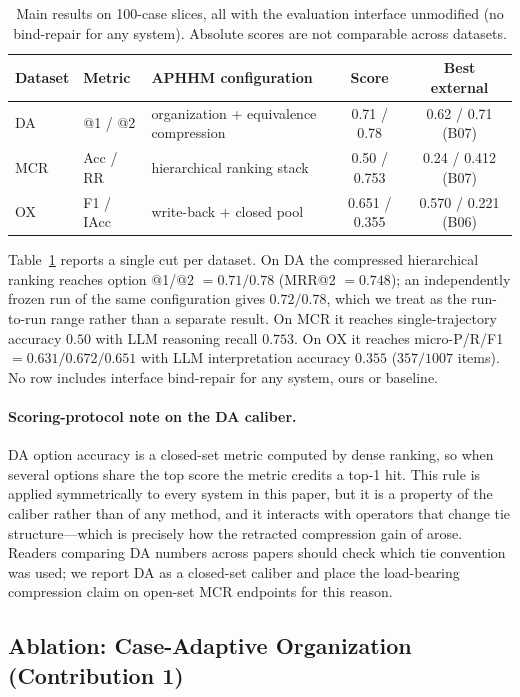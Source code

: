 \begin{table}[t]
\centering
\small
\caption{Main results on 100-case slices, all with the evaluation interface unmodified (no bind-repair for any system). Absolute scores are not comparable across datasets.}
\label{tab:main}
\begin{tabular}{llp{3.4cm}cc}
\toprule
Dataset & Metric & APHHM configuration & Score & Best external \\
\midrule
DA & @1 / @2 & organization + equivalence compression & 0.71 / 0.78 & 0.62 / 0.71 (B07) \\
MCR & Acc / RR & hierarchical ranking stack & 0.50 / 0.753 & 0.24 / 0.412 (B07) \\
OX & F1 / IAcc & write-back + closed pool & 0.651 / 0.355 & 0.570 / 0.221 (B06) \\
\bottomrule
\end{tabular}
\end{table}

Table~\ref{tab:main} reports a single cut per dataset.
On DA the compressed hierarchical ranking reaches option @1/@2 $=0.71/0.78$ (MRR@2 $=0.748$); an independently frozen run of the same configuration gives $0.72/0.78$, which we treat as the run-to-run range rather than a separate result.
On MCR it reaches single-trajectory accuracy $0.50$ with LLM reasoning recall $0.753$.
On OX it reaches micro-P/R/F1 $=0.631/0.672/0.651$ with LLM interpretation accuracy $0.355$ ($357/1007$ items).
No row includes interface bind-repair for any system, ours or baseline.

\paragraph{Scoring-protocol note on the DA caliber.}
DA option accuracy is a closed-set metric computed by dense ranking, so when several options share the top score the metric credits a top-1 hit.
This rule is applied symmetrically to every system in this paper, but it is a property of the caliber rather than of any method, and it interacts with operators that change tie structure---which is precisely how the retracted compression gain of  arose.
Readers comparing DA numbers across papers should check which tie convention was used; we report DA as a closed-set caliber and place the load-bearing compression claim on open-set MCR endpoints for this reason.

\subsection{Ablation: Case-Adaptive Organization (Contribution 1)}
\label{sec:res-org}

